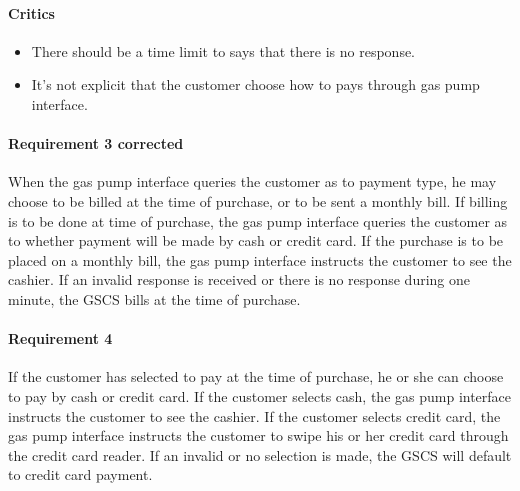 \begin{framed}
    \paragraph{Critics}
    \begin{itemize}
        \item There should be a time limit to says that there is no
            response.
        \item It's not explicit that the customer choose how to pays
            through gas pump interface.
    \end{itemize}

    \paragraph{Requirement 3 corrected} When the gas pump interface queries the
    customer as to payment type, he may choose to be billed at the
    time of purchase, or to be sent a monthly bill.
    If billing is to be done at time of purchase, the gas pump
    interface queries the customer as to whether payment will be
    made by cash or credit card. If the purchase is to be placed on
    a monthly bill, the gas pump interface instructs the customer to
    see the cashier. If an invalid response is received or there is
    no response during one minute, the GSCS bills at the time of purchase.
\end{framed}

\paragraph{Requirement 4} If the customer has selected to pay at the time of
purchase, he or she can choose to pay by cash or credit card. If the
customer selects cash, the gas pump interface instructs the customer to see
the cashier. If the customer selects credit card, the gas pump interface
instructs the customer to swipe his or her credit card through the credit
card reader. If an invalid or no selection is made, the GSCS will default
to credit card payment.


